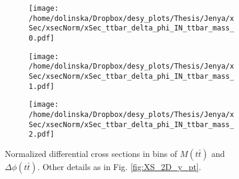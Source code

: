 \begin{figure}[H]
\centering
\begin{subfigure}
  \centering
  \texttt{[image: /home/dolinska/Dropbox/desy\_plots/Thesis/Jenya/xSec/xsecNorm/xSec\_ttbar\_delta\_phi\_IN\_ttbar\_mass\_0.pdf]}
\end{subfigure}
\begin{subfigure}
  \centering
  \texttt{[image: /home/dolinska/Dropbox/desy\_plots/Thesis/Jenya/xSec/xsecNorm/xSec\_ttbar\_delta\_phi\_IN\_ttbar\_mass\_1.pdf]}
\end{subfigure}
\begin{subfigure}
  \centering
  \texttt{[image: /home/dolinska/Dropbox/desy\_plots/Thesis/Jenya/xSec/xsecNorm/xSec\_ttbar\_delta\_phi\_IN\_ttbar\_mass\_2.pdf]}
\end{subfigure}
\caption{Normalized differential cross sections in bins of $M(t\bar{t})$ and $\Delta\phi(t\bar{t})$. Other details as in Fig. \ref{fig:XS_2D_y_pt}.}
\label{fig:XS_2D_phi_Mtt}
\end{figure}

